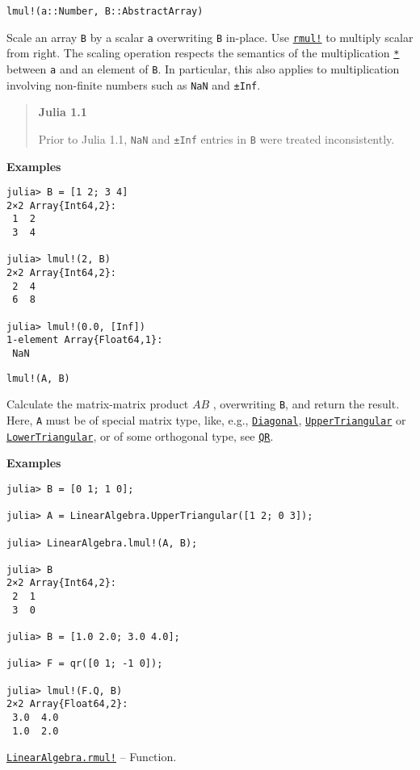 \begin{adjustwidth}{2em}{0pt}


\begin{verbatim}
lmul!(a::Number, B::AbstractArray)
\end{verbatim}

Scale an array \texttt{B} by a scalar \texttt{a} overwriting \texttt{B} in-place.  Use \hyperlink{11562785155463579477}{\texttt{rmul!}} to multiply scalar from right.  The scaling operation respects the semantics of the multiplication \hyperlink{7592762607639177347}{\texttt{*}} between \texttt{a} and an element of \texttt{B}.  In particular, this also applies to multiplication involving non-finite numbers such as \texttt{NaN} and \texttt{±Inf}.

\begin{quote}
\textbf{Julia 1.1}

Prior to Julia 1.1, \texttt{NaN} and \texttt{±Inf} entries in \texttt{B} were treated inconsistently.

\end{quote}
\textbf{Examples}


\begin{verbatim}
julia> B = [1 2; 3 4]
2×2 Array{Int64,2}:
 1  2
 3  4

julia> lmul!(2, B)
2×2 Array{Int64,2}:
 2  4
 6  8

julia> lmul!(0.0, [Inf])
1-element Array{Float64,1}:
 NaN
\end{verbatim}




\begin{lstlisting}
lmul!(A, B)
\end{lstlisting}

Calculate the matrix-matrix product  \(AB\) , overwriting \texttt{B}, and return the result. Here, \texttt{A} must be of special matrix type, like, e.g., \hyperlink{3300114559258360989}{\texttt{Diagonal}}, \hyperlink{6344726545165008167}{\texttt{UpperTriangular}} or \hyperlink{15116078732779234709}{\texttt{LowerTriangular}}, or of some orthogonal type, see \hyperlink{16913872014958777367}{\texttt{QR}}.

\textbf{Examples}


\begin{verbatim}
julia> B = [0 1; 1 0];

julia> A = LinearAlgebra.UpperTriangular([1 2; 0 3]);

julia> LinearAlgebra.lmul!(A, B);

julia> B
2×2 Array{Int64,2}:
 2  1
 3  0

julia> B = [1.0 2.0; 3.0 4.0];

julia> F = qr([0 1; -1 0]);

julia> lmul!(F.Q, B)
2×2 Array{Float64,2}:
 3.0  4.0
 1.0  2.0
\end{verbatim}



\end{adjustwidth}
\hypertarget{11562785155463579477}{} 
\hyperlink{11562785155463579477}{\texttt{LinearAlgebra.rmul!}}  -- {Function.}

